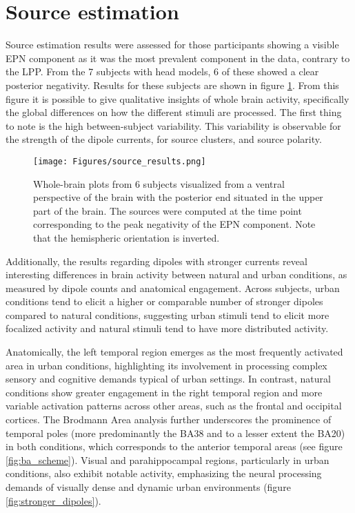 \section{Source estimation}
\label{section:enhanced}

Source estimation results were assessed for those participants showing a visible EPN component as it was the most prevalent component in the data, contrary to the LPP. From the 7 subjects with head models, 6 of these showed a clear posterior negativity. Results for these subjects are shown in figure \ref{fig:source_results}. From this figure it is possible to give qualitative insights of whole brain activity, specifically the global differences on how the different stimuli are processed. The first thing to note is the high between-subject variability. This variability is observable for the strength of the dipole currents, for source clusters, and source polarity.

\begin{figure}[H]
	\centering
	\texttt{[image: Figures/source\_results.png]}
	\caption{Whole-brain plots from 6 subjects visualized from a ventral perspective of the brain with the posterior end situated in the upper part of the brain. The sources were computed at the time point corresponding to the peak negativity of the EPN component. Note that the hemispheric orientation is inverted. \label{fig:source_results}}
\end{figure}

Additionally, the results regarding dipoles with stronger currents reveal interesting differences in brain activity between natural and urban conditions, as measured by dipole counts and anatomical engagement. Across subjects, urban conditions tend to elicit a higher or comparable number of stronger dipoles compared to natural conditions, suggesting urban stimuli tend to elicit more focalized activity and natural stimuli tend to have more distributed activity.

Anatomically, the left temporal region emerges as the most frequently activated area in urban conditions, highlighting its involvement in processing complex sensory and cognitive demands typical of urban settings. In contrast, natural conditions show greater engagement in the right temporal region and more variable activation patterns across other areas, such as the frontal and occipital cortices. The Brodmann Area analysis further underscores the prominence of temporal poles (more predominantly the BA38 and to a lesser extent the BA20) in both conditions, which corresponds to the anterior temporal areas (see figure \ref{fig:ba_scheme}). Visual and parahippocampal regions, particularly in urban conditions, also exhibit notable activity, emphasizing the neural processing demands of visually dense and dynamic urban environments (figure \ref{fig:stronger_dipoles}).

